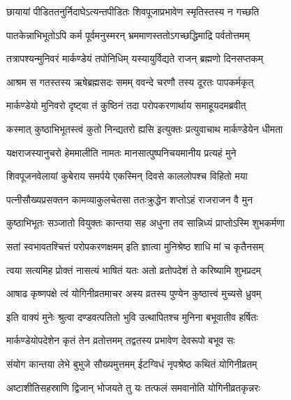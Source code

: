 \twolineshloka
{छायायां पीडिततनुर्निदाघेऽत्यन्तपीडितः}
{शिवपूजाप्रभावेण स्मृतिस्तस्य न गच्छति} %

\twolineshloka
{पातकेन्नाभिभूतोऽपि कर्म पूर्वमनुस्मरन्}
{भ्रममाणस्ततोऽगच्छद्धिमाद्रि पर्वतोत्तमम्} %

\twolineshloka
{तत्रापश्यन्मुनिवरं मार्कण्डेयं तपोनिधिम्}
{यस्यायुर्विद्यते राजन् ब्रह्मणो दिनसप्तकम्} %

\twolineshloka
{आश्रम स गतस्तस्य ऋषेब्रह्मसदः समम्}
{ववन्दे चरणौ तस्य दूरतः पापकर्मकृत्} %

\twolineshloka
{मार्कण्डेयो मुनिवरो दृष्ट्वा तं कुष्ठिनं तदा}
{परोपकरणार्थाय समाहूयदमब्रवीत्} %


\twolineshloka
{कस्मात् कुष्ठाभिभूतस्त्वं कुतो निन्द्यतरो ह्यसि}
{इत्युक्तः प्रत्युवाचाथ मार्कण्डेयेन धीमता} %


\twolineshloka
{यक्षराजस्यानुचरो हेममालीति नामतः}
{मानसात्पुष्पनिचयमानीय प्रत्यहं मुने} %

\twolineshloka
{शिवपूजनवेलायां कुबेराय समर्पये}
{एकस्मिन् दिवसे काललोपश्च विहितो मया} %

\twolineshloka
{पत्नीसौख्यप्रसक्तन कामव्याकुलचेतसा}
{ततःक्रुद्धेन शप्तोऽहं राजराजन वै मुन} %

\twolineshloka
{कुष्ठाभिभूतः सञ्जातो वियुक्तः कान्तया सह}
{अधुना तव सान्निध्यं प्राप्तोऽस्मि शुभकर्मणा} %

\twolineshloka
{सतां स्वभावतश्चित्तं परोपकरणक्षमम्}
{इति ज्ञात्वा मुनिश्रेष्ठ शाधि मां च कृतैनसम्} %


\twolineshloka
{त्वया सत्यमिह प्रोक्तं नासत्यं भाषितं यतः}
{अतो व्रतोपदेशं ते करिष्यामि शुभप्रदम्} %

\twolineshloka
{आषाढ कृष्णपक्षे त्वं योगिनीव्रतमाचर}
{अस्य व्रतस्य पुण्येन कुष्ठात्त्वं मुच्यसे ध्रुवम्} %

\twolineshloka
{इति वाक्यं मुनेः श्रुत्वा दण्डवत्पतितो भुवि}
{उत्थापितश्च मुनिना बभूवातीव हर्षितः} %

\twolineshloka
{मार्कण्डेयोपदेशेन कृतं तेन व्रतोत्तमम्}
{तद्वतस्य प्रभावेण देवरूपो बभूव सः} %

\twolineshloka
{संयोग कान्तया लेभे बुभुजे सौख्यमुत्तमम्}
{ईटग्विधं नृपश्रेष्ठ कथितं योगिनीव्रतम्} %

\twolineshloka
{अष्टाशीतिसहस्राणि द्विजान् भोजयते तु यः}
{तत्फलं समवानोति योगिनीव्रतकृन्नरः} %

